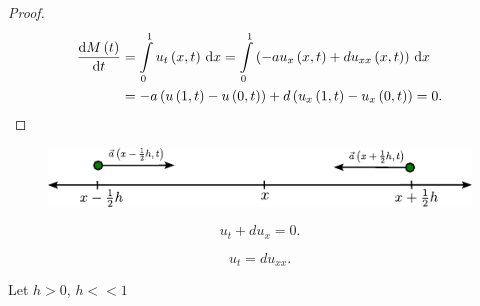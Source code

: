 \begin{frame}
    \begin{proof}
        \begin{align*}
            \diff{M\left(t\right)}{t} & =
            \int\limits_{0}^{1}
            u_{t}\left(x,t\right)
            \dl x=
            \int\limits_{0}^{1}
            \left(
            -au_{x}\left(x,t\right)+
            du_{xx}\left(x,t\right)
            \right)\dl x                  \\
                                      & =
            -a\left(
            u\left(1,t\right)-
            u\left(0,t\right)
            \right)+
            d\left(
            u_{x}\left(1,t\right)-
            u_{x}\left(0,t\right)
            \right)=0.
        \end{align*}
    \end{proof}

    \begin{figure}[ht!]
        \centering
        \includegraphics[width=.4\paperwidth]{deduction}
    \end{figure}

    \begin{definition}
        \begin{equation*}
            u_{t}+du_{x}=0.
        \end{equation*}
    \end{definition}

    \begin{definition}
        \begin{equation*}
            u_{t}=
            du_{xx}.
        \end{equation*}
    \end{definition}

    Let $h>0$, $h<<1$
\end{frame}
